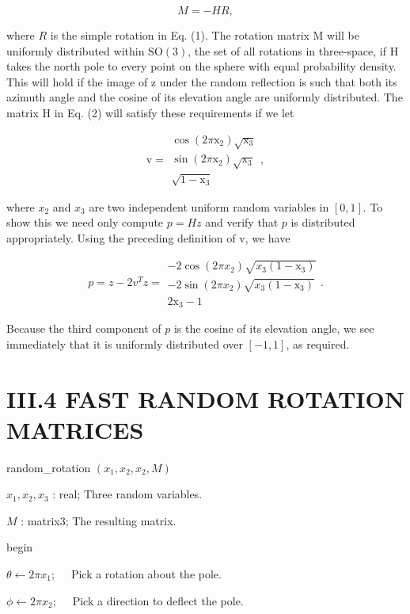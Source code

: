 $$
M=-H R,
$$

where $R$ is the simple rotation in Eq. (1). The rotation matrix M will be uniformly distributed within $\mathrm{SO}(3)$, the set of all rotations in three-space, if $\mathrm{H}$ takes the north pole to every point on the sphere with equal probability density. This will hold if the image of z under the random reflection is such that both its azimuth angle and the cosine of its elevation angle are uniformly distributed. The matrix $\mathrm{H}$ in Eq. (2) will satisfy these requirements if we let

$$
\mathrm{v}=\begin{gathered}
\cos \left(2 \pi \mathrm{x}_{2}\right) \sqrt{\mathrm{x}_{3}} \\
\sin \left(2 \pi \mathrm{x}_{2}\right) \sqrt{\mathrm{x}_{3}} \\
\sqrt{1-\mathrm{x}_{3}}
\end{gathered},
$$

where $x_{2}$ and $x_{3}$ are two independent uniform random variables in $[0,1]$. To show this we need only compute $p=H z$ and verify that $p$ is distributed appropriately. Using the preceding definition of $\mathrm{v}$, we have

$$
p=z-2 v^{T} z=\begin{gathered}
-2 \cos \left(2 \pi x_{2}\right) \sqrt{x_{3}\left(1-\mathrm{x}_{3}\right)} \\
-2 \sin \left(2 \pi x_{2}\right) \sqrt{x_{3}\left(1-\mathrm{x}_{3}\right)} \\
2 \mathrm{x}_{3}-1
\end{gathered} .
$$

Because the third component of $p$ is the cosine of its elevation angle, we see immediately that it is uniformly distributed over $[-1,1]$, as required.

\section{III.4 FAST RANDOM ROTATION MATRICES}
random\_rotation $\left(x_{1}, x_{2}, x_{2}, M\right)$

$x_{1}, x_{2}, x_{3}$ : real; Three random variables.

$M$ : matrix3; The resulting matrix.

begin

$\theta \leftarrow 2 \pi x_{1} ; \quad$ Pick a rotation about the pole.

$\phi \leftarrow 2 \pi x_{2} ; \quad$ Pick a direction to deflect the pole.

